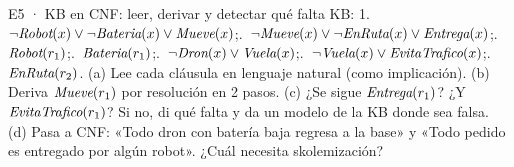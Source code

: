 \begin{ejercicio}{E5 · KB en CNF: leer, derivar y detectar qué falta }
KB: 1.\ $\neg\textit{Robot}(x)\vee\neg\textit{Bateria}(x)\vee\textit{Mueve}(x)$;.\ $\neg\textit{Mueve}(x)\vee\neg\textit{EnRuta}(x)\vee\textit{Entrega}(x)$;.\ $\textit{Robot}(r_1)$;.\ $\textit{Bateria}(r_1)$;.\ $\neg\textit{Dron}(x)\vee\textit{Vuela}(x)$;.\ $\neg\textit{Vuela}(x)\vee\textit{EvitaTrafico}(x)$;.\ $\textit{EnRuta}(r_2)$.
(a) Lee cada cláusula en lenguaje natural (como implicación).
(b) Deriva $\textit{Mueve}(r_1)$ por resolución en 2 pasos.
(c) ¿Se sigue $\textit{Entrega}(r_1)$? ¿Y $\textit{EvitaTrafico}(r_1)$? Si no, di qué falta y da un modelo de la KB donde sea falsa.
(d) Pasa a CNF: «Todo dron con batería baja regresa a la base» y «Todo pedido es entregado por algún
robot». ¿Cuál necesita skolemización?
\end{ejercicio}
